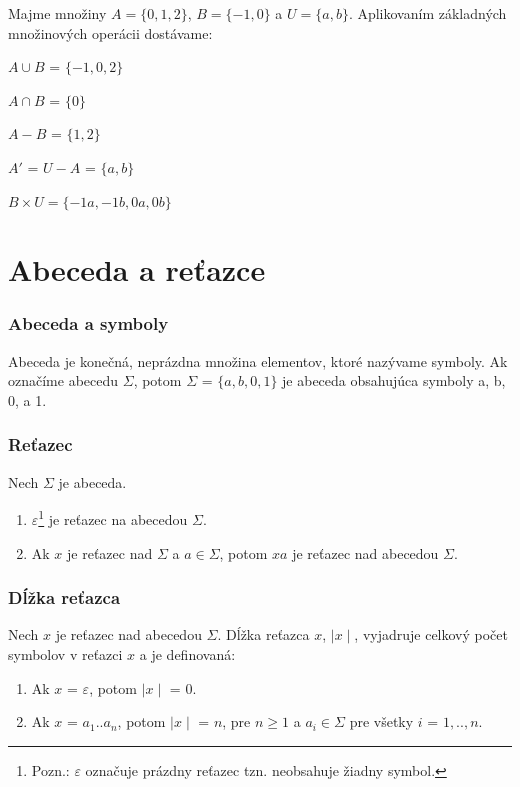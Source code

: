 \begin{theorem}
\normalfont Majme množiny $A = \{0, 1, 2\}$, $B = \{-1, 0\}$ a $U = \{a, b\}$. Aplikovaním základných množinových operácii dostávame:
\begin{center}
\item $A \cup B$ = $\{-1, 0, 2\}$
\item $A \cap B$ = $\{0\}$
\item $A - B$ = $\{1, 2\}$
\item $A'$ = $U - A$ = $\{a, b\}$
\item $B \times U = \{-1a, -1b, 0a, 0b \}$
\end{center} 
\end{theorem}

\section{Abeceda a reťazce}

\subsubsection{Abeceda a symboly}
Abeceda je konečná, neprázdna množina elementov, ktoré nazývame symboly. Ak označíme abecedu $\Sigma$, potom $\Sigma$ = $\{a, b, 0, 1\}$ je abeceda obsahujúca symboly a, b, 0, a 1.

\subsubsection{Reťazec}

Nech $\Sigma$ je abeceda.
\begin{enumerate}
\item $\varepsilon$\footnote{Pozn.: $\varepsilon$ označuje prázdny reťazec tzn. neobsahuje žiadny symbol.} je reťazec na abecedou $\Sigma$.
\item Ak $x$ je reťazec nad $\Sigma$ a $a \in \Sigma$, potom $xa$ je reťazec nad abecedou $\Sigma$.
\end{enumerate}

\subsubsection{Dĺžka reťazca}

Nech $x$ je reťazec nad abecedou $\Sigma$. Dĺžka reťazca $x$, $\mid x \mid$, vyjadruje celkový počet symbolov v reťazci $x$ a je definovaná:
\begin{enumerate}
\item Ak $x$ = $\varepsilon$, potom $\mid x \mid$ = $0$.
\item Ak $x$ = $a_1..a_n$, potom $\mid x \mid$ = $n$, pre $n\geq1$ a $a_i \in \Sigma$ pre všetky $i$ = $1,..,n$.
\end{enumerate}

